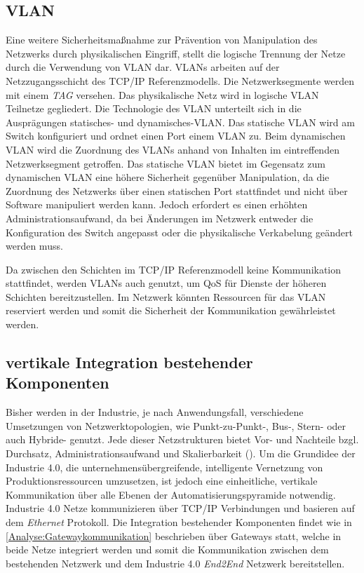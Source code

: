\subsection{\ac{VLAN}}
\label{Analyse:VLAN}
Eine weitere Sicherheitsmaßnahme zur Prävention von Manipulation des Netzwerks durch physikalischen Eingriff, stellt die logische Trennung der Netze durch die Verwendung von \ac{VLAN} dar. \ac{VLAN}s arbeiten auf der Netzzugangsschicht des \ac{TCP}/\ac{IP} Referenzmodells. Die Netzwerksegmente werden mit einem \textit{TAG} versehen. Das physikalische Netz wird in logische \ac{VLAN} Teilnetze gegliedert. Die Technologie des \ac{VLAN} unterteilt sich in die Ausprägungen statisches- und dynamisches-\ac{VLAN}. Das statische \ac{VLAN} wird am Switch konfiguriert und ordnet einen Port einem \ac{VLAN} zu. Beim dynamischen \ac{VLAN} wird die Zuordnung des \ac{VLAN}s anhand von Inhalten im eintreffenden Netzwerksegment getroffen. Das statische \ac{VLAN} bietet im Gegensatz zum dynamischen \ac{VLAN} eine höhere Sicherheit gegenüber Manipulation, da die Zuordnung des Netzwerks über einen statischen Port stattfindet und nicht über Software manipuliert werden kann. Jedoch erfordert es einen erhöhten Administrationsaufwand, da bei Änderungen im Netzwerk entweder die Konfiguration des Switch angepasst oder die physikalische Verkabelung geändert werden muss.

Da zwischen den Schichten im \ac{TCP}/\ac{IP} Referenzmodell keine Kommunikation stattfindet, werden \ac{VLAN}s auch genutzt, um \ac{QoS} für Dienste der höheren Schichten bereitzustellen. Im Netzwerk könnten Ressourcen für das \ac{VLAN} reserviert werden und somit die Sicherheit der Kommunikation gewährleistet werden. 

\subsection{vertikale Integration bestehender Komponenten}
Bisher werden in der Industrie, je nach Anwendungsfall, verschiedene Umsetzungen von Netzwerktopologien, wie Punkt-zu-Punkt-, Bus-, Stern- oder auch Hybride- genutzt. Jede dieser Netzstrukturen bietet Vor- und Nachteile bzgl. Durchsatz, Administrationsaufwand und Skalierbarkeit (\cite{burke2013}). Um die Grundidee der Industrie 4.0, die unternehmensübergreifende, intelligente Vernetzung von Produktionsressourcen umzusetzen, ist jedoch eine einheitliche, vertikale Kommunikation über alle Ebenen der Automatisierungspyramide notwendig. Industrie 4.0 Netze kommunizieren über \ac{TCP}/\ac{IP} Verbindungen und basieren auf dem \textit{Ethernet} Protokoll. Die Integration bestehender Komponenten findet wie in \autoref{Analyse:Gatewaykommunikation} beschrieben über Gateways statt, welche in beide Netze integriert werden und somit die Kommunikation zwischen dem bestehenden Netzwerk und dem Industrie 4.0 \textit{End2End} Netzwerk bereitstellen.

